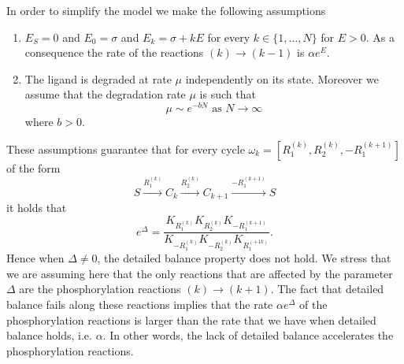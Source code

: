 \documentclass{article}
\numberwithin{equation}{section}
\theoremstyle{plain}
\begin{document}
In order to simplify the model we make the following assumptions
\begin{enumerate}
    \item $E_S =0$ and $E_0=\sigma $ and $E_k = \sigma + k E $ for every $ k \in \{ 1, \dots, N\} $ for $E>0$. As a consequence the rate of the reactions $(k) \rightarrow (k-1) $ is $\alpha e^{E} $. 
    \item The ligand is degraded at rate $\mu $ independently on its state. 
    Moreover we assume that the degradation rate $\mu $ is such that 
\begin{equation}\label{degradation}
\mu \sim e^{- b N } \text{ as } N \to \infty
\end{equation}
where $b >0$. 
\end{enumerate}
These assumptions guarantee that for every cycle
 $\omega _k=[R_1^{(k)}, R_2^{(k)}, -R_1^{(k+1)}]$ of the form 
\[
S \overset{R_1^{(k)}} \longrightarrow C_k  \overset{R_2^{(k)}}\longrightarrow C_{k+1}  \overset{- R_1^{(k+1)}}\longrightarrow S
\]
it holds that 
\begin{equation} \label{lack of db}
e^{\Delta} = \frac{ K_{R_1^{(k)}}K_{R_2^{(k)}} K_{-R_1^{(k+1)}}  }{ K_{- R_1^{(k)} }K_{- R_2^{(k)} }K_{ R_1^{(+1k)} }}. 
\end{equation}
Hence when $\Delta \neq 0$, the detailed balance property does not hold. 
We stress that we are assuming here that the only reactions that are affected by the parameter $\Delta $ are the phosphorylation reactions $(k ) \rightarrow (k+1) $. The fact that detailed balance fails along these reactions implies that the rate $\alpha e^\Delta$ of the phosphorylation reactions is larger than the rate that we have when detailed balance holds, i.e. $\alpha $. In other words, the lack of detailed balance accelerates the phosphorylation reactions.  
\end{document}
